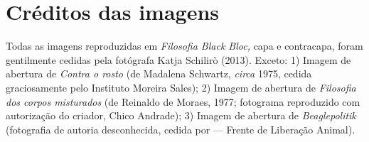 \section*{Créditos das imagens}

Todas as imagens reproduzidas em \emph{Filosofia Black Bloc, }capa e
contracapa, foram gentilmente cedidas pela fotógrafa Katja
Schilirò (2013). Exceto: 1) Imagem de abertura de \emph{Contra o rosto}
(de Madalena Schwartz, \emph{circa} 1975, cedida graciosamente pelo
Instituto Moreira Sales); 2) Imagem de abertura de \emph{Filosofia dos
corpos misturados} (de Reinaldo de Moraes, 1977; fotograma reproduzido
com autorização do criador, Chico Andrade); 3) Imagem de abertura de
\emph{Beaglepolitik} (fotografia de autoria desconhecida, cedida por 
--- Frente de Liberação Animal).







